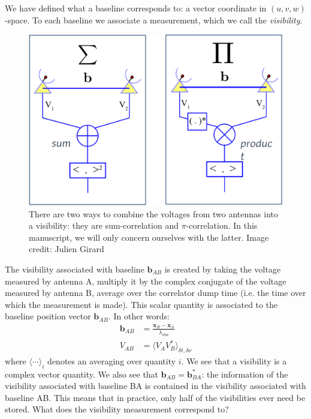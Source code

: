 \pg
We have defined what a baseline corresponds to: a vector coordinate in $(u,v,w)$-space. To each baseline we associate a measurement, which we call the \emph{visibility}. 
\begin{figure}[ht]
\centering
\includegraphics[width=.7\textwidth]{images/visibility-creation.png}
\caption{\label{fig.visibility} There are two ways to combine the voltages from two antennas into a visibility: they are sum-correlation and $\pi$-correlation. In this manuscript, we will only concern ourselves with the latter. Image credit: Julien Girard}
\end{figure}
The visibility associated with baseline $\mathbf{b}_{AB}$ is created by taking the voltage measured by antenna A, multiply it by the complex conjugate of the voltage measured by antenna B, average over the correlator dump time (i.e. the time over which the measurement is made). This scalar quantity is associated to the baseline position vector $\mathbf{b}_{AB}$. In other words:
\begin{align}
\mathbf{b}_{AB} &= \frac{\mathbf{x}_{B}-\mathbf{x}_{A}}{\lambda_\mathrm{obs}}\\
V_{AB}          &= \langle V_{A} V_{B}^*\rangle_{\delta t, \delta \nu} 
\end{align}
where $\langle \cdots \rangle_{i}$ denotes an averaging over quantity $i$. We see that a visibility is a complex vector quantity. We also see that $\mathbf{b}_{AB} = \mathbf{b}_{BA}^*$: the information of the visibility associated with baseline BA is contained in the visibility associated with baseline AB. This means that in practice, only half of the visibilities ever need be stored. What does the visibility measurement correspond to?
